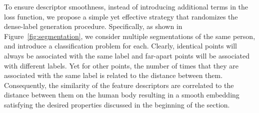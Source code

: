 \documentclass[10pt,twocolumn,letterpaper]{article}
\DeclareMathOperator*{\argmax}{arg\,max}
\begin{document}
To ensure descriptor smoothness, instead of introducing additional terms in the loss function, we propose a simple yet effective strategy that randomizes the dense-label generation procedure. Specifically, as shown in Figure~\ref{fig:segmentation}, we consider multiple segmentations of the same person, and introduce a classification problem for each. %
Clearly, identical points will always be associated with the same label and far-apart points will be associated with different labels. Yet for other points, the number of times that they are associated with the same label is related to the distance between them. Consequently, the similarity of the feature descriptors are correlated to the distance between them on the human body resulting in a smooth embedding satisfying the desired properties discussed in the beginning of the section. %
\end{document}
